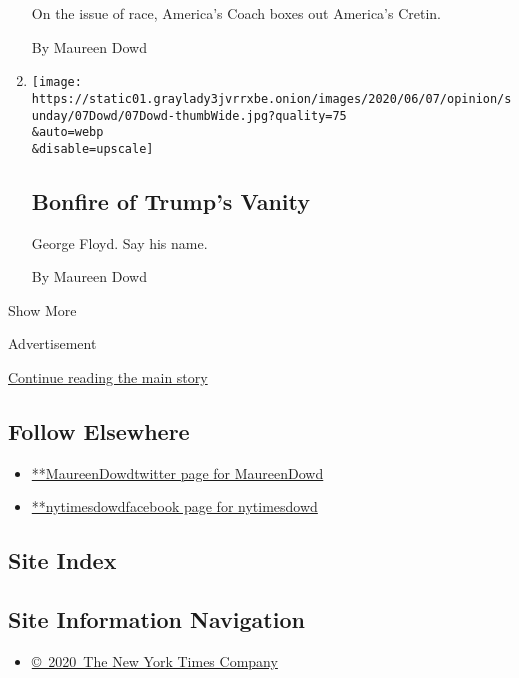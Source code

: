 \begin{enumerate}
  On the issue of race, America's Coach boxes out America's Cretin.

  By Maureen Dowd
\item
  \href{/2020/06/06/opinion/trump-washington-monuments-george-floyd-protests.html}{}

  \texttt{[image: https://static01.graylady3jvrrxbe.onion/images/2020/06/07/opinion/sunday/07Dowd/07Dowd-thumbWide.jpg?quality=75\\\&auto=webp\\\&disable=upscale]}

  \hypertarget{bonfire-of-trumps-vanity}{%
  \subsection{Bonfire of Trump's
  Vanity}\label{bonfire-of-trumps-vanity}}

  George Floyd. Say his name.

  By Maureen Dowd
\end{enumerate}

Show More

Advertisement

\protect\hyperlink{after-mid2}{Continue reading the main story}

\hypertarget{follow-elsewhere}{%
\subsection{Follow Elsewhere}\label{follow-elsewhere}}

\begin{itemize}
\tightlist
\item
  \href{https://twitter.com/MaureenDowd}{**MaureenDowdtwitter page for
  MaureenDowd}
\item
  \href{https://www.facebookcorewwwi.onion/nytimesdowd}{**nytimesdowdfacebook
  page for nytimesdowd}
\end{itemize}

\hypertarget{site-index}{%
\subsection{Site Index}\label{site-index}}

\hypertarget{site-information-navigation}{%
\subsection{Site Information
Navigation}\label{site-information-navigation}}

\begin{itemize}
\tightlist
\item
  \href{https://help.nytimes3xbfgragh.onion/hc/en-us/articles/115014792127-Copyright-notice}{©~2020~The
  New York Times Company}
\end{itemize}

